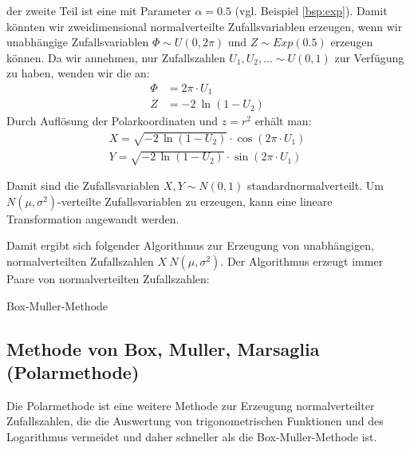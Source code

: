 der zweite Teil ist eine  mit
Parameter $\alpha=0.5$ (vgl. Beispiel \ref{bsp:exp}). Damit könnten wir
zweidimensional normalverteilte Zufallsvariablen erzeugen, wenn wir unabhängige
Zufallsvariablen $\Phi\sim U(0,2\pi)$ und $Z\sim Exp(0.5)$ erzeugen können.
Da wir annehmen, nur Zufallszahlen $U_1, U_2, ... \sim U(0,1)$ zur Verfügung zu
haben, wenden wir die  an:
\begin{align*}
\Phi &= 2\pi \cdot U_1 \\
Z &= -2\ \ln(1-U_2)
\end{align*}
Durch Auflösung der Polarkoordinaten und $z = r^2$ erhält man:
\begin{align*}
X = \sqrt{-2\,\ln(1-U_2)}\cdot\cos(2\pi\cdot U_1) \\
Y = \sqrt{-2\,\ln(1-U_2)}\cdot\sin(2\pi\cdot U_1)
\end{align*}

Damit sind die Zufallsvariablen $X,Y \sim N(0,1)$ standardnormalverteilt. Um
$N(\mu, \sigma^2)$-verteilte Zufallsvariablen zu erzeugen, kann eine lineare
Transformation angewandt werden.

\medskip
Damit ergibt sich folgender Algorithmus zur Erzeugung von unabhängigen,
normalverteilten Zufallszahlen $X~N(\mu, \sigma^2)$. Der Algorithmus erzeugt
immer Paare von normalverteilten Zufallszahlen:

\begin{algorithm}[h!]
\DontPrintSemicolon
\LinesNumbered


\caption{Box-Muller-Methode}\label{algo:box-muller}
\end{algorithm}

\subsection{Methode von Box, Muller, Marsaglia (Polarmethode)}

Die Polarmethode ist eine weitere Methode zur Erzeugung normalverteilter
Zufallszahlen, die die Auswertung von trigonometrischen Funktionen und des
Logarithmus vermeidet und daher schneller als die Box-Muller-Methode ist.

